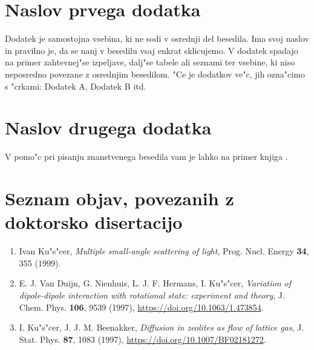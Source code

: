 \cleardoublepage{}
\renewcommand\appendixname{Dodatek}
\begin{appendices}

%
\chapter{Naslov prvega dodatka}
    
Dodatek je samostojna vsebina, ki ne sodi v osrednji del besedila. 
Ima svoj naslov in pravilno je, da se nanj v besedilu vsaj enkrat sklicujemo.
V dodatek spadajo na primer zahtevnej"se izpeljave, dalj"se tabele 
ali seznami ter vsebine, ki niso neposredno povezane z osrednjim besedilom. 
"Ce je dodatkov ve"c, jih ozna"cimo s "crkami: Dodatek A, Dodatek B itd.

%
\chapter{Naslov drugega dodatka}
    
V pomo"c pri pisanju znanstvenega besedila vam je lahko na primer knjiga \cite{All}.

\end{appendices}


\cleardoublepage
\printindex


\cleardoublepage{}
{}
\chapter*{Seznam objav, povezanih z doktorsko disertacijo}


\begin{enumerate}

\item
Ivan Ku"s"cer,
\textit{Multiple small-angle scattering of light},
Prog. Nucl. Energy
\textbf{34},
355 (1999).

\item
E. J. Van Duijn, G. Nienhuis, L. J. F. Hermans, I. Ku"s"cer,
\textit{Variation of dipole-dipole interaction with rotational state: experiment and theory},
J. Chem. Phys.
\textbf{106},
9539 (1997),
\url{https://doi.org/10.1063/1.473854}.

\item
I. Ku"s"cer, J. J. M. Beenakker,
\textit{Diffusion in zeolites as flow of lattice gas},
J. Stat. Phys.
\textbf{87},
1083 (1997),
\url{https://doi.org/10.1007/BF02181272}.

\end{enumerate}


